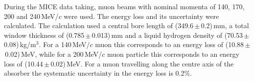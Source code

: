 During the MICE data taking, muon beams with nominal momenta of 140,
170, 200 and 240\,MeV/$c$ were used.
The energy loss and its uncertainty were calculated.
The calculation used a central bore length of
(349.6\,$\mathrm{\pm}$\,0.2)\,mm, a total window thickness of
(0.785\,$\mathrm{\pm}$\,0.013)\,mm and a liquid hydrogen density of
\linebreak[4] 
(70.53\,$\mathrm{\pm}$\,0.08)\,kg/m$^{3}$.
For a 140\,MeV/$c$ muon this corresponds to an energy loss of
(10.88\,$\mathrm{\pm}$\,0.02)\,MeV, while for a 200\,MeV/$c$ muon 
particle this corresponds to an energy loss of
(10.44\,$\mathrm{\pm}$\,0.02)\,MeV.
For a muon travelling along the centre axis of the absorber the
systematic uncertainty in the energy loss is 0.2\%.

